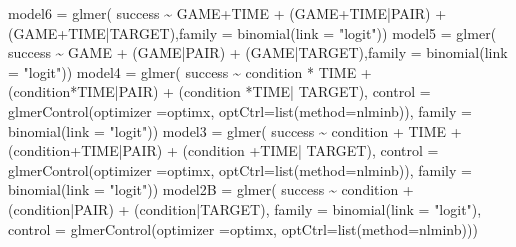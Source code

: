 \documentclass[
]{article}
\newenvironment{Shaded}{\begin{snugshade}}{\end{snugshade}}
\newcommand{\AttributeTok}[1]{\textcolor[rgb]{0.77,0.63,0.00}{#1}}
\newcommand{\FunctionTok}[1]{\textcolor[rgb]{0.00,0.00,0.00}{#1}}
\newcommand{\NormalTok}[1]{#1}
\newcommand{\OtherTok}[1]{\textcolor[rgb]{0.56,0.35,0.01}{#1}}
\newcommand{\SpecialCharTok}[1]{\textcolor[rgb]{0.00,0.00,0.00}{#1}}
\newcommand{\StringTok}[1]{\textcolor[rgb]{0.31,0.60,0.02}{#1}}
\begin{document}
\begin{Shaded}
\begin{Highlighting}[]
\NormalTok{model6 }\OtherTok{=} \FunctionTok{glmer}\NormalTok{( success }\SpecialCharTok{\textasciitilde{}}\NormalTok{ GAME}\SpecialCharTok{+}\NormalTok{TIME }\SpecialCharTok{+}\NormalTok{ (GAME}\SpecialCharTok{+}\NormalTok{TIME}\SpecialCharTok{|}\NormalTok{PAIR) }\SpecialCharTok{+}\NormalTok{ (GAME}\SpecialCharTok{+}\NormalTok{TIME}\SpecialCharTok{|}\NormalTok{TARGET),}\AttributeTok{family =} \FunctionTok{binomial}\NormalTok{(}\AttributeTok{link =} \StringTok{"logit"}\NormalTok{))}
\NormalTok{model5 }\OtherTok{=} \FunctionTok{glmer}\NormalTok{( success }\SpecialCharTok{\textasciitilde{}}\NormalTok{ GAME }\SpecialCharTok{+}\NormalTok{ (GAME}\SpecialCharTok{|}\NormalTok{PAIR) }\SpecialCharTok{+}\NormalTok{ (GAME}\SpecialCharTok{|}\NormalTok{TARGET),}\AttributeTok{family =} \FunctionTok{binomial}\NormalTok{(}\AttributeTok{link =} \StringTok{"logit"}\NormalTok{))}
\NormalTok{model4 }\OtherTok{=} \FunctionTok{glmer}\NormalTok{( success }\SpecialCharTok{\textasciitilde{}}\NormalTok{ condition }\SpecialCharTok{*}\NormalTok{ TIME }\SpecialCharTok{+}\NormalTok{ (condition}\SpecialCharTok{*}\NormalTok{TIME}\SpecialCharTok{|}\NormalTok{PAIR) }\SpecialCharTok{+}\NormalTok{ (condition }\SpecialCharTok{*}\NormalTok{TIME}\SpecialCharTok{|}\NormalTok{ TARGET), }\AttributeTok{control =} \FunctionTok{glmerControl}\NormalTok{(}\AttributeTok{optimizer =}\StringTok{\textquotesingle{}optimx\textquotesingle{}}\NormalTok{, }\AttributeTok{optCtrl=}\FunctionTok{list}\NormalTok{(}\AttributeTok{method=}\StringTok{\textquotesingle{}nlminb\textquotesingle{}}\NormalTok{)), }\AttributeTok{family =} \FunctionTok{binomial}\NormalTok{(}\AttributeTok{link =} \StringTok{"logit"}\NormalTok{))}
\NormalTok{model3 }\OtherTok{=} \FunctionTok{glmer}\NormalTok{( success }\SpecialCharTok{\textasciitilde{}}\NormalTok{ condition }\SpecialCharTok{+}\NormalTok{ TIME }\SpecialCharTok{+}\NormalTok{ (condition}\SpecialCharTok{+}\NormalTok{TIME}\SpecialCharTok{|}\NormalTok{PAIR) }\SpecialCharTok{+}\NormalTok{ (condition }\SpecialCharTok{+}\NormalTok{TIME}\SpecialCharTok{|}\NormalTok{ TARGET), }\AttributeTok{control =} \FunctionTok{glmerControl}\NormalTok{(}\AttributeTok{optimizer =}\StringTok{\textquotesingle{}optimx\textquotesingle{}}\NormalTok{, }\AttributeTok{optCtrl=}\FunctionTok{list}\NormalTok{(}\AttributeTok{method=}\StringTok{\textquotesingle{}nlminb\textquotesingle{}}\NormalTok{)),  }\AttributeTok{family =} \FunctionTok{binomial}\NormalTok{(}\AttributeTok{link =} \StringTok{"logit"}\NormalTok{))}
\NormalTok{model2B }\OtherTok{=} \FunctionTok{glmer}\NormalTok{( success }\SpecialCharTok{\textasciitilde{}}\NormalTok{ condition }\SpecialCharTok{+}\NormalTok{ (condition}\SpecialCharTok{|}\NormalTok{PAIR) }\SpecialCharTok{+}\NormalTok{ (condition}\SpecialCharTok{|}\NormalTok{TARGET), }\AttributeTok{family =} \FunctionTok{binomial}\NormalTok{(}\AttributeTok{link =} \StringTok{"logit"}\NormalTok{), }\AttributeTok{control =} \FunctionTok{glmerControl}\NormalTok{(}\AttributeTok{optimizer =}\StringTok{\textquotesingle{}optimx\textquotesingle{}}\NormalTok{, }\AttributeTok{optCtrl=}\FunctionTok{list}\NormalTok{(}\AttributeTok{method=}\StringTok{\textquotesingle{}nlminb\textquotesingle{}}\NormalTok{)))}

\end{Highlighting}
\end{Shaded}
\end{document}
